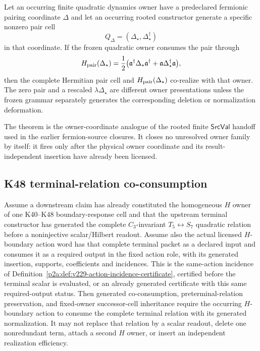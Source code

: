 \documentclass[12pt,a4paper]{article}
\begin{document}
\begin{corollary}
\label{p2a:cor:v3109-finite-pair-cell-specialization}
Let an occurring finite quadratic dynamics owner have a predeclared fermionic
pairing coordinate $\Delta$ and let an occurring rooted constructor generate a
specific nonzero pair cell
\[
 Q_\Delta=(\Delta_\star,\Delta_\star^\dagger)
\]
in that coordinate.  If the frozen quadratic owner consumes the pair through
\[
 H_{\rm pair}(\Delta_\star)
 =\frac12\bigl(
   \mathfrak a^\dagger\Delta_\star\mathfrak a^\dagger
   +\mathfrak a\Delta_\star^\dagger\mathfrak a
  \bigr),
\]
then the complete Hermitian pair cell and $H_{\rm pair}(\Delta_\star)$
co-realize with that owner.  The zero pair and a rescaled
$\lambda\Delta_\star$ are different owner presentations unless the frozen
grammar separately generates the corresponding deletion or normalization
deformation.
\end{corollary}

\begin{remark}
\label{p2a:rem:v3109-source-certificate-relation}
The theorem is the owner-coordinate analogue of the rooted finite
$\mathsf{SrcVal}$ handoff used in the earlier fermion-source closures.  It
closes no unresolved owner family by itself: it fires only after the physical
owner coordinate and its result-independent insertion have already been
licensed.
\end{remark}

\subsection{K48 terminal-relation co-consumption}
\label{p2a:sec:v3111-k48-terminal-consumption}

\begin{corollary}
\label{p2a:cor:v3111-k48-terminal-consumption}
Assume a downstream claim has already constituted the homogeneous $H$ owner of
one K40--K48 boundary-response cell and that the upstream terminal constructor
has generated the complete $C_3$-invariant $T_5\leftrightarrow S_7$ quadratic
relation before a noninjective scalar/Hilbert readout. Assume also the
actual licensed $H$-boundary action word has that complete terminal packet
as a declared input and consumes it as a required output in the fixed
action role, with its generated insertion, supports, coefficients and
incidences. This is the same-action incidence of
Definition~\ref{p2a:def:v229-action-incidence-certificate}, certified before
the terminal scalar is evaluated, or an already generated certificate
with this same required-output status. Then generated
co-consumption, preterminal-relation preservation, and fixed-owner
successor-cell inheritance require the occurring $H$-boundary action to consume
the complete terminal relation with its generated normalization.  It may not
replace that relation by a scalar readout, delete one nonredundant term, attach
a second $H$ owner, or insert an independent realization efficiency.
\end{corollary}
\end{document}
